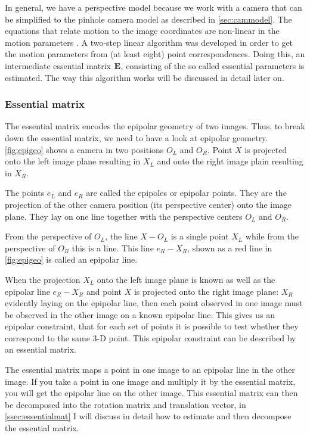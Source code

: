 In general, we have a perspective model because we work with a camera that can be simplified to the pinhole camera model as described in \autoref{sec:cammodel}. The equations that relate motion to the image coordinates are non-linear in the motion parameters \cite{tekalp}. A two-step linear algorithm was developed in order to get the motion parameters from (at least eight) point correspondences. Doing this, an intermediate essential matrix $\mathbf{E}$, consisting of the so called essential parameters is estimated. The way this algorithm works will be discussed in detail later on.

\subsubsection{Essential matrix}
The essential matrix encodes the epipolar geometry of two images. Thus, to break down the essential matrix, we need to have a look at epipolar geometry. \autoref{fig:epigeo} shows a camera in two positions $O_L$ and $O_R$. Point $X$ is projected onto the left image plane resulting in $X_L$ and onto the right image plain resulting in $X_R$.\bigskip

The points $e_L$ and $e_R$ are called the epipoles or epipolar points. They are the projection of the other camera position (its perspective center) onto the image plane. They lay on one line together with the perspective centers $O_L$ and $O_R$.\bigskip

From the perspective of $O_L$, the line $X-O_L$ is a single point $X_L$ while from the perspective of $O_R$ this is a line. This line $e_R-X_R$, shown as a red line in \autoref{fig:epigeo} is called an epipolar line.\bigskip

When the projection $X_L$ onto the left image plane is known as well as the epipolar line $e_R-X_R$ and point $X$ is projected onto the right image plane: $X_R$ evidently laying on the epipolar line, then each point observed in one image must be observed in the other image on a known epipolar line. This gives us an epipolar constraint, that for each set of points it is possible to test whether they correspond to the same 3-D point. This epipolar constraint can be described by an essential matrix.\bigskip

The essential matrix maps a point in one image to an epipolar line in the other image. If you take a point in one image and multiply it by the essential matrix, you will get the epipolar line on the other image. This essential matrix can then be decomposed into the rotation matrix and translation vector, in \autoref{ssec:essentialmat} I will discuss in detail how to estimate and then decompose the essential matrix.

